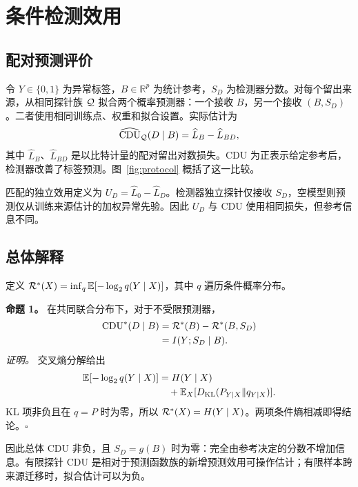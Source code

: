 \section{条件检测效用}
\subsection{配对预测评价}
令 $Y\in\{0,1\}$ 为异常标签，$B\in\mathbb R^p$ 为统计参考，$S_D$ 为检测器分数。对每个留出来源，从相同探针族 $\mathcal{Q}$ 拟合两个概率预测器：一个接收 $B$，另一个接收 $(B,S_D)$。二者使用相同训练点、权重和拟合设置。实际估计为
\begin{equation}
\widehat{\operatorname{CDU}}_{\mathcal{Q}}(D\mid B)=\widehat L_B-\widehat L_{BD},
\label{eq:cdu}
\end{equation}
其中 $\widehat L_B$、$\widehat L_{BD}$ 是以比特计量的配对留出对数损失。CDU 为正表示给定参考后，检测器改善了标签预测。图~\ref{fig:protocol} 概括了这一比较。

匹配的独立效用定义为 $U_D=\widehat L_0-\widehat L_D$。检测器独立探针仅接收 $S_D$，空模型则预测仅从训练来源估计的加权异常先验。因此 $U_D$ 与 CDU 使用相同损失，但参考信息不同。

\subsection{总体解释}
定义 $\mathcal{R}^*(X)=\inf_q\mathbb{E}[-\log_2 q(Y\mid X)]$，其中 $q$ 遍历条件概率分布。
\par\noindent\textbf{命题 1。} 在共同联合分布下，对于不受限预测器，
\begin{equation}
\begin{aligned}
\operatorname{CDU}^*(D\mid B)&=\mathcal{R}^*(B)-\mathcal{R}^*(B,S_D)\\
&=I(Y;S_D\mid B).
\end{aligned}
\end{equation}
\noindent\textit{证明。} 交叉熵分解给出
\begin{equation}
\begin{aligned}
\mathbb{E}[-\log_2 q(Y\mid X)]&=H(Y\mid X)\\
&\quad+\mathbb{E}_X[D_{\rm KL}(P_{Y\mid X}\Vert q_{Y\mid X})].
\end{aligned}
\end{equation}
KL 项非负且在 $q=P$ 时为零，所以 $\mathcal{R}^*(X)=H(Y\mid X)$。两项条件熵相减即得结论。\hfill$\square$

因此总体 CDU 非负，且 $S_D=g(B)$ 时为零：完全由参考决定的分数不增加信息。有限探针 CDU 是相对于预测函数族的新增预测效用可操作估计；有限样本跨来源迁移时，拟合估计可以为负。

